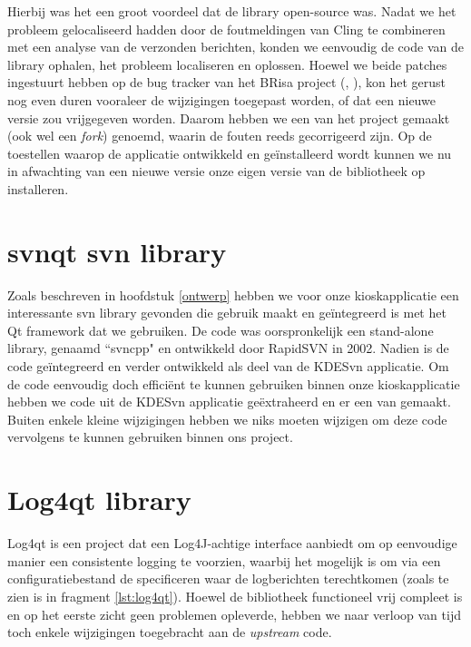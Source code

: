 Hierbij was het een groot voordeel dat de library open-source was. Nadat we het probleem gelocaliseerd hadden door de foutmeldingen van Cling te combineren met een analyse van de verzonden berichten, konden we eenvoudig de code van de library ophalen, het probleem localiseren en oplossen. Hoewel we beide patches ingestuurt hebben op de bug tracker van het BRisa project (, ), kon het gerust nog even duren vooraleer de wijzigingen toegepast worden, of dat een nieuwe versie zou vrijgegeven worden. Daarom hebben we een  van het project gemaakt (ook wel een \emph{fork}) genoemd, waarin de fouten reeds gecorrigeerd zijn. Op de toestellen waarop de applicatie ontwikkeld en geïnstalleerd wordt kunnen we nu in afwachting van een nieuwe versie onze eigen versie van de bibliotheek op installeren.

\section{svnqt \acs{svn} library}
\label{kiosk:realisatie:svnqt}

Zoals beschreven in hoofdstuk \ref{ontwerp} hebben we voor onze kioskapplicatie een interessante \ac{svn} library gevonden die gebruik maakt en geïntegreerd is met het Qt framework dat we gebruiken. De code was oorspronkelijk een stand-alone library, genaamd ``svncpp" en ontwikkeld door RapidSVN in 2002. Nadien is de code geïntegreerd en verder ontwikkeld als deel van de KDESvn applicatie. Om de code eenvoudig doch efficiënt te kunnen gebruiken binnen onze kioskapplicatie hebben we code uit de KDESvn applicatie geëxtraheerd en er een  van gemaakt. Buiten enkele kleine wijzigingen hebben we niks moeten wijzigen om deze code vervolgens te kunnen gebruiken binnen ons project.

\section{Log4qt library}
\label{kiosk:realisatie:log4qt}

Log4qt is een project dat een Log4J-achtige interface aanbiedt om op eenvoudige manier een consistente logging te voorzien, waarbij het mogelijk is om via een configuratiebestand de specificeren waar de logberichten terechtkomen (zoals te zien is in fragment \ref{lst:log4qt}). Hoewel de bibliotheek functioneel vrij compleet is en op het eerste zicht geen problemen opleverde, hebben we naar verloop van tijd toch enkele wijzigingen toegebracht aan de \emph{upstream} code.

